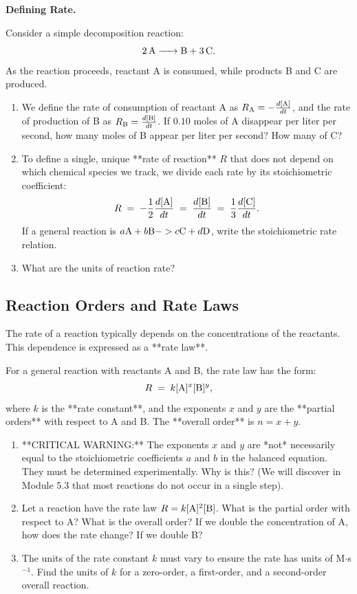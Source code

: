 \documentclass[12pt, a4paper]{book}
\begin{document}
\begin{puzzlebox}
\textbf{Defining Rate.}

Consider a simple decomposition reaction:
\[
  \ce{2 A -> B + 3 C}.
\]
As the reaction proceeds, reactant A is consumed, while products B and C are produced.
\begin{enumerate}[label=(\alph*), leftmargin=*]
  \item We define the rate of consumption of reactant A as $R_{\ce{A}} = -\frac{d[\ce{A}]}{dt}$, and the rate of production of B as $R_{\ce{B}} = \frac{d[\ce{B}]}{dt}$. If $0.10$ moles of A disappear per liter per second, how many moles of B appear per liter per second? How many of C?
  \item To define a single, unique **rate of reaction** $R$ that does not depend on which chemical species we track, we divide each rate by its stoichiometric coefficient:
  \[
    R \;=\; -\frac{1}{2}\frac{d[\ce{A}]}{dt} \;=\; \frac{d[\ce{B}]}{dt} \;=\; \frac{1}{3}\frac{d[\ce{C}]}{dt}.
  \]
  If a general reaction is $a\ce{A} + b\ce{B} -> c\ce{C} + d\ce{D}$, write the stoichiometric rate relation.
  \item What are the units of reaction rate?
\end{enumerate}
\end{puzzlebox}

\subsection{Reaction Orders and Rate Laws}

The rate of a reaction typically depends on the concentrations of the reactants. This dependence is expressed as a **rate law**.

\begin{explobox}
For a general reaction with reactants A and B, the rate law has the form:
\[
  R \;=\; k [\ce{A}]^x [\ce{B}]^y,
\]
where $k$ is the **rate constant**, and the exponents $x$ and $y$ are the **partial orders** with respect to A and B. The **overall order** is $n = x + y$.
\begin{enumerate}[label=(\alph*), leftmargin=*]
  \item **CRITICAL WARNING:** The exponents $x$ and $y$ are *not* necessarily equal to the stoichiometric coefficients $a$ and $b$ in the balanced equation. They must be determined experimentally. Why is this? (We will discover in Module 5.3 that most reactions do not occur in a single step).
  \item Let a reaction have the rate law $R = k[\ce{A}]^2 [\ce{B}]$. What is the partial order with respect to A? What is the overall order? If we double the concentration of A, how does the rate change? If we double B?
  \item The units of the rate constant $k$ must vary to ensure the rate has units of M$\cdot$s$^{-1}$. Find the units of $k$ for a zero-order, a first-order, and a second-order overall reaction.
\end{enumerate}
\end{explobox}
\end{document}

